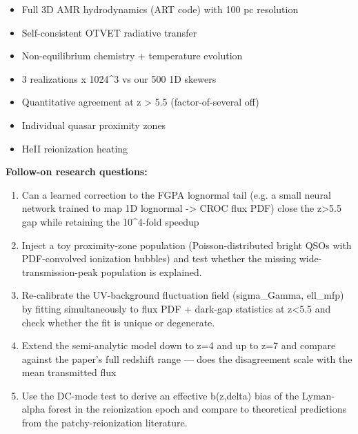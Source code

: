 \documentclass[11pt]{article}
\begin{document}
\begin{itemize}[leftmargin=1.4em,itemsep=0.2em,topsep=0.2em]
\item Full 3D AMR hydrodynamics (ART code) with 100 pc resolution
\item Self-consistent OTVET radiative transfer
\item Non-equilibrium chemistry + temperature evolution
\item 3 realizations x 1024\textasciicircum{}3 vs our 500 1D skewers
\item Quantitative agreement at z \textgreater{} 5.5 (factor-of-several off)
\item Individual quasar proximity zones
\item HeII reionization heating
\end{itemize}\noindent\textbf{Follow-on research questions:}
\begin{enumerate}[leftmargin=1.6em,itemsep=0.2em,topsep=0.2em,label=Q\arabic*.]
\item Can a learned correction to the FGPA lognormal tail (e.g. a small neural network trained to map 1D lognormal -\textgreater{} CROC flux PDF) close the z\textgreater{}5.5 gap while retaining the 10\textasciicircum{}4-fold speedup
\item Inject a toy proximity-zone population (Poisson-distributed bright QSOs with PDF-convolved ionization bubbles) and test whether the missing wide-transmission-peak population is explained.
\item Re-calibrate the UV-background fluctuation field (sigma\_Gamma, ell\_mfp) by fitting simultaneously to flux PDF + dark-gap statistics at z\textless{}5.5 and check whether the fit is unique or degenerate.
\item Extend the semi-analytic model down to z=4 and up to z=7 and compare against the paper's full redshift range --- does the disagreement scale with the mean transmitted flux
\item Use the DC-mode test to derive an effective b(z,delta) bias of the Lyman-alpha forest in the reionization epoch and compare to theoretical predictions from the patchy-reionization literature.
\end{enumerate}
\end{document}
